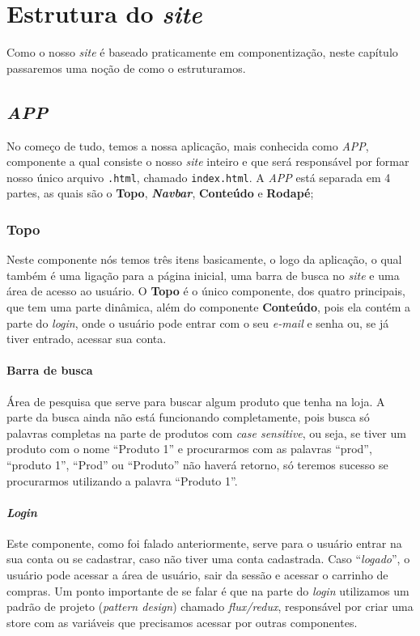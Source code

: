 \chapter{Estrutura do \emph{site}}
Como o nosso \emph{site} é baseado praticamente em componentização, neste
capítulo passaremos uma noção de como o estruturamos.

\section{\emph{APP}}
No começo de tudo, temos a nossa aplicação, mais conhecida como \emph{APP},
componente a qual consiste o nosso \emph{site} inteiro e que será responsável
por formar nosso único arquivo \texttt{.html}, chamado \texttt{index.html}. A
\emph{APP} está separada em 4 partes, as quais são o \textbf{Topo},
\emph{\textbf{Navbar}}, \textbf{Conteúdo} e \textbf{Rodapé};

\subsection{Topo}
Neste componente nós temos três itens basicamente, o logo da aplicação, o qual
também é uma ligação para a página inicial, uma barra de busca no \emph{site} e
uma área de acesso ao usuário. O \textbf{Topo} é o único componente, dos quatro
principais, que tem uma parte dinâmica, além do componente \textbf{Conteúdo},
pois ela contém a parte do \emph{login}, onde o usuário pode entrar com o seu
\emph{e-mail} e senha ou, se já tiver entrado, acessar sua conta.

\subsubsection{Barra de busca}
Área de pesquisa que serve para buscar algum produto que tenha na loja. A parte
da busca ainda não está funcionando completamente, pois busca só palavras
completas na parte de produtos com \emph{case sensitive}, ou seja, se tiver um
produto com o nome “Produto 1” e procurarmos com as palavras “prod”, “produto
1”, “Prod” ou “Produto” não haverá retorno, só teremos sucesso se procurarmos
utilizando a palavra “Produto 1”.

\subsubsection{\emph{Login}}
Este componente, como foi falado anteriormente, serve para o usuário entrar na
sua conta ou se cadastrar, caso não tiver uma conta cadastrada. Caso
“\emph{logado}”, o usuário pode acessar a área de usuário, sair da sessão e
acessar o carrinho de compras. Um ponto importante de se falar é que na parte do
\emph{login} utilizamos um padrão de projeto (\emph{pattern design}) chamado
\emph{flux/redux}, responsável por criar uma store com as variáveis que
precisamos acessar por outras componentes.

